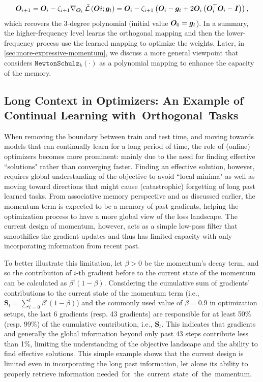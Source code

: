 \begin{align}\label{eq:muon2}
    \boldsymbol{O}_{i+1} = \boldsymbol{O}_{i} - \zeta_{i+1} \nabla_{\boldsymbol{O}_{i}} \:\tilde{\mathcal{L}}\left(\boldsymbol{O}_{}i; \boldsymbol{g}_{t}\right) = \boldsymbol{O}_{i} - \zeta_{i+1} \left( \boldsymbol{O}_{i} - \boldsymbol{g}_{t} +  2 \boldsymbol{O}_i \left(\boldsymbol{O}_i^{\top} \boldsymbol{O}_i - \boldsymbol{I}\right) \right),
\end{align}
which recovers the 3-degree polynomial (initial value $\boldsymbol{O}_{0} = \boldsymbol{g}_t$). In a summary, the higher-frequency level learns the orthogonal mapping and then the lower-frequency process use the learned mapping to optimize the weights.  Later, in \autoref{sec:more-expressive-momentum}, we discuss a more general viewpoint that considers $\texttt{NewtonSchulz}_k\left(\cdot \right)$ as a polynomial mapping to enhance the capacity of the memory. 





\subsection{Long Context in Optimizers: An Example of Continual Learning with~Orthogonal~Tasks} \label{sec:Optimizers-continual-learning}
When removing the boundary between train and test time, and  moving towards models that can continually learn for a long period of time, the role of (online) optimizers becomes more prominent: mainly due to the need for finding effective ``solutions" rather than converging faster. Finding an effective solution, however, requires global understanding of the objective to avoid ``local minima" as well as moving toward directions that might cause (catastrophic) forgetting of long past learned tasks. From associative memory perspective and as discussed earlier, the momentum term is expected to be a memory of past gradients, helping the optimization process to have a more global view of the loss landscape. The current design of momentum, however, acts as a simple low-pass filter that smoothifies the gradient updates and thus has limited capacity with only incorporating information from recent past. 


To better illustrate this limitation, let $\beta > 0$ be the momentum's decay term, and so the contribution of $i$-th gradient before to the current state of the momentum can be calculated as $\beta^{i} \left(1 - \beta\right)$. Considering the cumulative sum of gradients' contributions to the current state of the momentum term (i.e., $\boldsymbol{S}_t = \sum_{i = 0}^{t}  \beta^{i} (1-\beta)$) and the commonly used value of $\beta = 0.9$ in optimization setups, the last 6 gradients (resp. 43 gradients) are responsible for at least 50\% (resp. 99\%) of the cumulative contribution, i.e., $\boldsymbol{S}_t$. This indicates that gradients and generally the global information beyond only past 43 steps contribute less than 1\%, limiting the understanding of the  objective landscape and the ability to find effective solutions. This simple example shows that the current design is limited even in incorporating the long past information, let alone its ability to properly retrieve information needed~for~the~current~state~of~the~momentum.  

